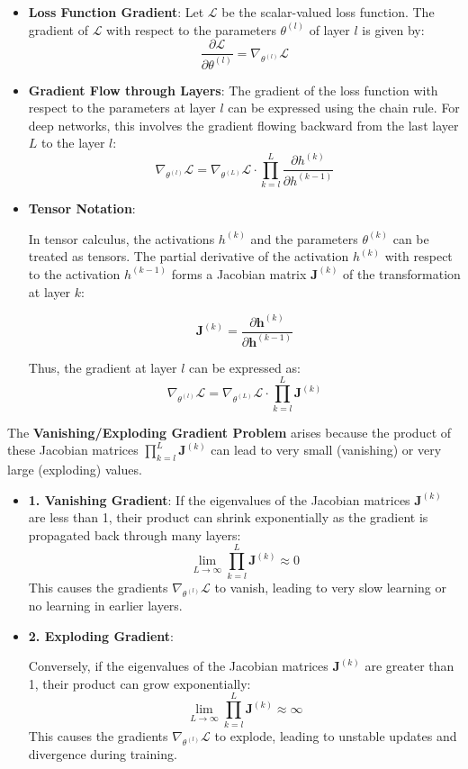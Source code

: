 \documentclass{article}
\begin{document}
\begin{itemize}
\item \textbf{Loss Function Gradient}:  
Let \( \mathcal{L} \) be the scalar-valued loss function. The gradient of \( \mathcal{L} \) with respect to the parameters \( \theta^{(l)} \) of layer \( l \) is given by:
\[
\frac{\partial \mathcal{L}}{\partial \theta^{(l)}} = \nabla_{\theta^{(l)}} \mathcal{L}
\]

\item \textbf{Gradient Flow through Layers}: 
The gradient of the loss function with respect to the parameters at layer \( l \) can be expressed using the chain rule. For deep networks, this involves the gradient flowing backward from the last layer \( L \) to the layer \( l \):
\[
\nabla_{\theta^{(l)}} \mathcal{L} = \nabla_{\theta^{(L)}} \mathcal{L} \cdot \prod_{k=l}^{L} \frac{\partial h^{(k)}}{\partial h^{(k-1)}}
\]


\item \textbf{Tensor Notation}: 

In tensor calculus, the activations \( h^{(k)} \) and the parameters \( \theta^{(k)} \) can be treated as tensors. The partial derivative of the activation \( h^{(k)} \) with respect to the activation \( h^{(k-1)} \) forms a Jacobian matrix \( \mathbf{J}^{(k)} \) of the transformation at layer \( k \):

\[
\mathbf{J}^{(k)} = \frac{\partial \mathbf{h}^{(k)}}{\partial \mathbf{h}^{(k-1)}}
\]

Thus, the gradient at layer \( l \) can be expressed as:
\[
\nabla_{\theta^{(l)}} \mathcal{L} = \nabla_{\theta^{(L)}} \mathcal{L} \cdot \prod_{k=l}^{L} \mathbf{J}^{(k)}
\]
\end{itemize}


The \textbf{Vanishing/Exploding Gradient Problem} arises because the product of these Jacobian matrices \( \prod_{k=l}^{L} \mathbf{J}^{(k)} \) can lead to very small (vanishing) or very large (exploding) values.

\begin{itemize}
    \item \textbf{1. Vanishing Gradient}:
   If the eigenvalues of the Jacobian matrices \( \mathbf{J}^{(k)} \) are less than 1, their product can shrink exponentially as the gradient is propagated back through many layers:
   \[
   \lim_{L \to \infty} \prod_{k=l}^{L} \mathbf{J}^{(k)} \approx 0
   \]
   This causes the gradients \( \nabla_{\theta^{(l)}} \mathcal{L} \) to vanish, leading to very slow learning or no learning in earlier layers.

   \item \textbf{2. Exploding Gradient}:

   Conversely, if the eigenvalues of the Jacobian matrices \( \mathbf{J}^{(k)} \) are greater than 1, their product can grow exponentially:
   \[
   \lim_{L \to \infty} \prod_{k=l}^{L} \mathbf{J}^{(k)} \approx \infty
   \]
   This causes the gradients \( \nabla_{\theta^{(l)}} \mathcal{L} \) to explode, leading to unstable updates and divergence during training.
\end{itemize}
\end{document}
